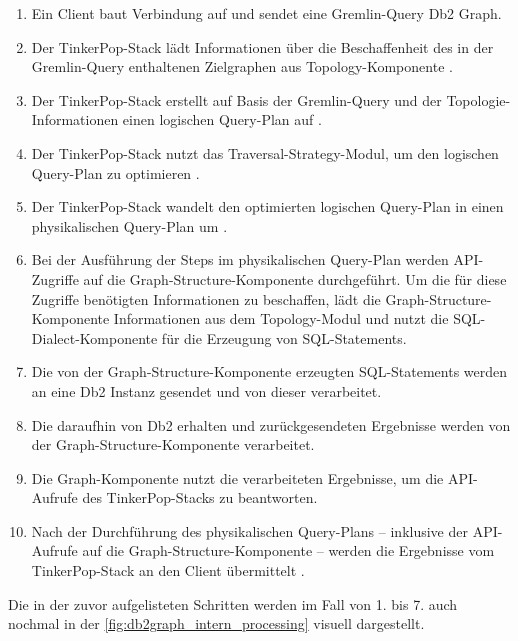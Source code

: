 \begin{enumerate}
    \item Ein Client baut Verbindung auf und sendet eine Gremlin-Query Db2 Graph.
    \item Der TinkerPop-Stack lädt Informationen über die Beschaffenheit des in der Gremlin-Query enthaltenen Zielgraphen aus Topology-Komponente \cite{vldb_tian,sigmod_tian, yt_tian}.
    \item Der TinkerPop-Stack erstellt auf Basis der Gremlin-Query und der Topologie-Informationen einen logischen Query-Plan auf \cite{vldb_tian,sigmod_tian, yt_tian}. 
    \item Der TinkerPop-Stack nutzt das Traversal-Strategy-Modul, um den logischen Query-Plan zu optimieren \cite{vldb_tian,sigmod_tian, yt_tian}.
    \item Der TinkerPop-Stack wandelt den optimierten logischen Query-Plan in einen physikalischen Query-Plan um \cite{vldb_tian,sigmod_tian, yt_tian}. 
    \item Bei der Ausführung der Steps im physikalischen Query-Plan werden API-Zugriffe auf die Graph-Structure-Komponente durchgeführt. Um die für diese Zugriffe benötigten Informationen zu beschaffen, lädt die Graph-Structure-Komponente Informationen aus dem Topology-Modul und nutzt die SQL-Dialect-Komponente für die Erzeugung von SQL-Statements. \cite{vldb_tian,sigmod_tian, yt_tian} 
    \item Die von der Graph-Structure-Komponente erzeugten SQL-Statements werden an eine Db2 Instanz gesendet und von dieser verarbeitet. \cite{vldb_tian,sigmod_tian, yt_tian}
    \item Die daraufhin von Db2 erhalten und zurückgesendeten Ergebnisse werden von der Graph-Structure-Komponente verarbeitet. \cite{yt_tian} 
    \item Die Graph-Komponente nutzt die verarbeiteten Ergebnisse, um die API-Aufrufe des TinkerPop-Stacks zu beantworten. \cite{vldb_tian,sigmod_tian, yt_tian} 
    \item Nach der Durchführung des physikalischen Query-Plans -- inklusive der API-Aufrufe auf die Graph-Structure-Komponente -- werden die Ergebnisse vom TinkerPop-Stack an den Client übermittelt \cite{vldb_tian,sigmod_tian, yt_tian}.
\end{enumerate}

Die in der zuvor aufgelisteten Schritten werden im Fall von 1. bis 7. auch nochmal in der \autoref{fig:db2graph_intern_processing} visuell dargestellt.

